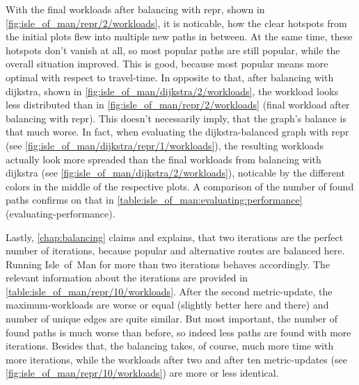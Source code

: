         With the final workloads after \gls{balancing} with \gls{repr}, shown in \vref{fig:isle_of_man/repr/2/workloads}, it is noticable, how the clear hotspots from the initial plots flew into multiple new paths in between.
        At the same time, these hotspots don't vanish at all, so most popular paths are still popular, while the overall situation improved.
        This is good, because most popular means more optimal with respect to travel-time.
        In opposite to that, after \gls{balancing} with \gls{dijkstra}, shown in \cref{fig:isle_of_man/dijkstra/2/workloads}, the workload looks less distributed than in \cref{fig:isle_of_man/repr/2/workloads} (final workload after \gls{balancing} with \gls{repr}).
        This doesn't necessarily imply, that the graph's balance is that much worse.
        In fact, when evaluating the \gls{dijkstra}-balanced graph with \gls{repr} (see \vref{fig:isle_of_man/dijkstra/repr/1/workloads}), the resulting workloads actually look more spreaded than the final workloads from \gls{balancing} with \gls{dijkstra} (see \cref{fig:isle_of_man/dijkstra/2/workloads}), noticable by the different colors in the middle of the respective plots.
        A comparison of the number of found paths confirms on that in \vref{table:isle_of_man:evaluating:performance} (evaluating-performance).

        Lastly, \cref{chap:balancing} claims and explains, that two iterations are the perfect number of iterations, because popular and alternative routes are balanced here.
        Running Isle~of~Man for more than two iterations behaves accordingly.
        The relevant information about the iterations are provided in \vref{table:isle_of_man/repr/10/workloads}.
        After the second \gls{metric}-update, the maximum-workloads are worse or equal (slightly better here and there) and number of unique edges are quite similar.
        But most important, the number of found paths is much worse than before, so indeed less paths are found with more iterations.
        Besides that, the \gls{balancing} takes, of course, much more time with more iterations, while the workloads after two and after ten \gls{metric}-updates (see \vref{fig:isle_of_man/repr/10/workloads}) are more or less identical.


